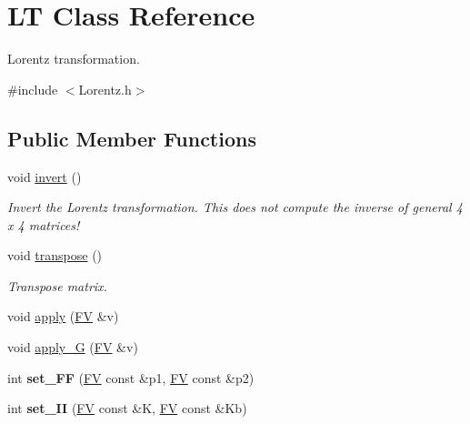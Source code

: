\hypertarget{classLT}{}\section{L\+T Class Reference}
\label{classLT}


Lorentz transformation.  




{\ttfamily \#include $<$Lorentz.\+h$>$}

\subsection*{Public Member Functions}
\begin{DoxyCompactItemize}
\item 
\hypertarget{classLT_a7467f60d847896710f21c17be6ee0b2c}{}void \hyperlink{classLT_a7467f60d847896710f21c17be6ee0b2c}{invert} ()\label{classLT_a7467f60d847896710f21c17be6ee0b2c}

\begin{DoxyCompactList}\small\item\em Invert the Lorentz transformation. This does not compute the inverse of general 4 x 4 matrices! \end{DoxyCompactList}\item 
\hypertarget{classLT_a6142dba94f0edc4eb2f8a0cc84a43ada}{}void \hyperlink{classLT_a6142dba94f0edc4eb2f8a0cc84a43ada}{transpose} ()\label{classLT_a6142dba94f0edc4eb2f8a0cc84a43ada}

\begin{DoxyCompactList}\small\item\em Transpose matrix. \end{DoxyCompactList}\item 
void \hyperlink{classLT_a3119b968c2cf6a9bbfb30615c01921d0}{apply} (\hyperlink{classFV}{F\+V} \&v)
\item 
void \hyperlink{classLT_abd17d410a8436a83b03f2dd2909ee59a}{apply\+\_\+\+G} (\hyperlink{classFV}{F\+V} \&v)
\item 
\hypertarget{classLT_acdccba2ab08b071219626bafb85f8e21}{}int {\bfseries set\+\_\+\+F\+F} (\hyperlink{classFV}{F\+V} const \&p1, \hyperlink{classFV}{F\+V} const \&p2)\label{classLT_acdccba2ab08b071219626bafb85f8e21}

\item 
\hypertarget{classLT_ac2718d29c891a91aa5058dc929ffecdd}{}int {\bfseries set\+\_\+\+I\+I} (\hyperlink{classFV}{F\+V} const \&K, \hyperlink{classFV}{F\+V} const \&Kb)\label{classLT_ac2718d29c891a91aa5058dc929ffecdd}


\end{DoxyCompactItemize}
